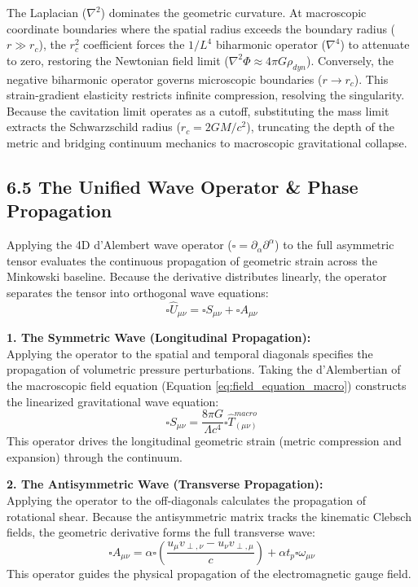 The Laplacian ($\nabla^2$) dominates the geometric curvature. At macroscopic coordinate boundaries where the spatial radius exceeds the boundary radius ($r \gg r_c$), the $r_c^2$ coefficient forces the $1/L^4$ biharmonic operator ($\nabla^4$) to attenuate to zero, restoring the Newtonian field limit ($\nabla^2 \Phi \approx 4\pi G \rho_{dyn}$). Conversely, the negative biharmonic operator governs microscopic boundaries ($r \to r_c$). This strain-gradient elasticity restricts infinite compression, resolving the singularity. Because the cavitation limit operates as a cutoff, substituting the mass limit extracts the Schwarzschild radius ($r_c = 2GM/c^2$), truncating the depth of the metric and bridging continuum mechanics to macroscopic gravitational collapse.


\subsection*{6.5 The Unified Wave Operator \& Phase Propagation}
Applying the 4D d'Alembert wave operator ($\square = \partial_\alpha \partial^\alpha$) to the full asymmetric tensor evaluates the continuous propagation of geometric strain across the Minkowski baseline. Because the derivative distributes linearly, the operator separates the tensor into orthogonal wave equations: 
\begin{equation}
    \square \hat{U}_{\mu\nu} = \square S_{\mu\nu} + \square A_{\mu\nu}
\end{equation}

\textbf{1. The Symmetric Wave (Longitudinal Propagation):} \\
Applying the operator to the spatial and temporal diagonals specifies the propagation of volumetric pressure perturbations. Taking the d'Alembertian of the macroscopic field equation (Equation \ref{eq:field_equation_macro}) constructs the linearized gravitational wave equation: 
\begin{equation}
    \square S_{\mu\nu} = \frac{8\pi G}{\Lambda c^4} \square \hat{T}^{macro}_{(\mu\nu)} 
\end{equation}
This operator drives the longitudinal geometric strain (metric compression and expansion) through the continuum.

\textbf{2. The Antisymmetric Wave (Transverse Propagation):} \\
Applying the operator to the off-diagonals calculates the propagation of rotational shear. Because the antisymmetric matrix tracks the kinematic Clebsch fields, the geometric derivative forms the full transverse wave: 
\begin{equation}
    \square A_{\mu\nu} = \alpha \square \left( \frac{u_\mu v_{\perp, \nu} - u_\nu v_{\perp, \mu}}{c} \right) + \alpha t_p \square \omega_{\mu\nu} 
\end{equation}
This operator guides the physical propagation of the electromagnetic gauge field. 

